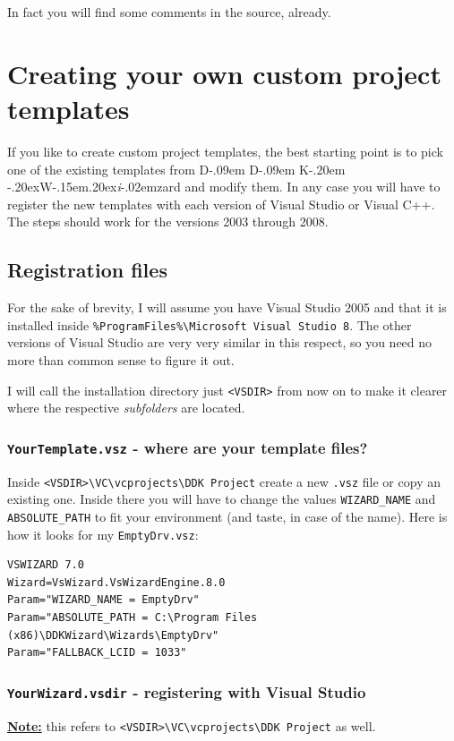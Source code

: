 \documentclass[a4paper,titlepage]{report}
\def\ddkwiz{\texorpdfstring{D\kern-.09em D\kern-.09em K\kern-.20em \raise-.20ex\hbox{W}\kern-.15em\raise.20ex\hbox{\it{i}}\kern-.02em{zard}}{DDKWizard}}
\begin{document}
In fact you will find some comments in the source, already.

\chapter{Creating your own custom project templates}
\label{cha:CreateOwnTemplates}
If you like to create custom project templates, the best starting point is to pick one
of the existing templates from \ddkwiz{} and modify them. In any case you will have to
register the new templates with each version of Visual Studio or Visual C++.
The steps should work for the versions 2003 through 2008.

\section{Registration files}
For the sake of brevity, I will assume you have Visual Studio 2005 and that it is installed
inside \verb+%ProgramFiles%\Microsoft Visual Studio 8+. The other versions of Visual Studio
are very very similar in this respect, so you need no more than common
sense to figure it out.

I will call the installation directory just \verb+<VSDIR>+ from now on to make it clearer
where the respective \emph{subfolders} are located.

\subsection{\texttt{YourTemplate.vsz} - where are your template files?}
Inside \verb+<VSDIR>\VC\vcprojects\DDK Project+ create a new \texttt{.vsz} file or copy
an existing one. Inside there you will have to change the values \verb+WIZARD_NAME+
and \verb+ABSOLUTE_PATH+ to fit your environment (and taste, in case of the name).
Here is how it looks for my \texttt{EmptyDrv.vsz}:\label{sec:templatepath}

\begin{verbatim}
VSWIZARD 7.0
Wizard=VsWizard.VsWizardEngine.8.0
Param="WIZARD_NAME = EmptyDrv"
Param="ABSOLUTE_PATH = C:\Program Files (x86)\DDKWizard\Wizards\EmptyDrv"
Param="FALLBACK_LCID = 1033"
\end{verbatim}

\subsection{\texttt{YourWizard.vsdir} - registering with Visual Studio}
\underline{\textbf{Note:}} this refers to \verb+<VSDIR>\VC\vcprojects\DDK Project+
as well.
\end{document}
